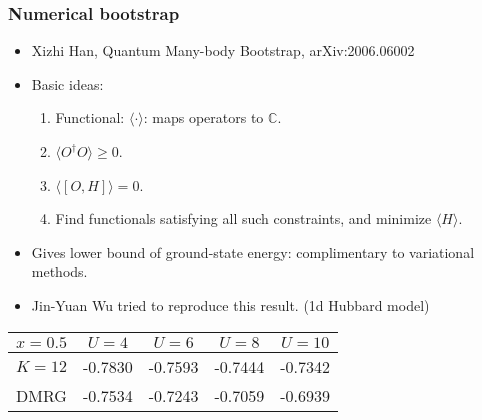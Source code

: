 \documentclass[xcolor=table, 10pt, aspectratio=169, ignorenonframetext]{beamer}
\begin{document}
\begin{frame}
  \frametitle{Numerical bootstrap}
  \begin{itemize}
  \item Xizhi Han, Quantum Many-body Bootstrap, arXiv:2006.06002
  \item Basic ideas:
    \begin{enumerate}
    \item Functional: $\langle\cdot\rangle$: maps operators to $\mathbb C$.
    \item $\langle O^\dagger O\rangle\geq0$.
    \item $\langle [O, H]\rangle=0$.
    \item Find functionals satisfying all such constraints, and minimize $\langle H\rangle$.
    \end{enumerate}
  \item Gives lower bound of ground-state energy: complimentary to variational methods.
  \item Jin-Yuan Wu tried to reproduce this result. (1d Hubbard model)
  \end{itemize}

  \begin{center}
    \begin{tabular}{c|cccc}
      \hline
    $x=0.5$ & $U=4$ & $U=6$ & $U=8$ & $U=10$\\
    \hline\hline
    $K=12$ & -0.7830 & -0.7593 & -0.7444 & -0.7342\\
    \hline
    DMRG & -0.7534 & -0.7243 & -0.7059 & -0.6939
  \end{tabular}    
  \end{center}
\end{frame}
\end{document}
